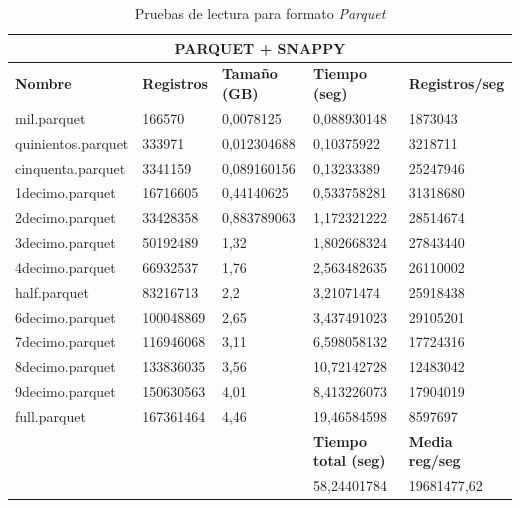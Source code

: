 \begin{table}[htp!]
	\centering
	\caption{Pruebas de lectura para formato \textit{Parquet}}
	\label{velocidadParquet}
	\begin{tabular}{|l|l|l|l|l|}
		\hline
		\multicolumn{5}{|c|}{\textbf{PARQUET + SNAPPY}}                                                                          \\ \hline
		\textbf{Nombre}    & \textbf{Registros} & \textbf{Tamaño (GB)} & \textbf{Tiempo (seg)} & \textbf{Registros/seg} \\ \hline
		mil.parquet        & 166570             & 0,0078125            & 0,088930148                 & 1873043                    \\ \hline
		quinientos.parquet & 333971             & 0,012304688          & 0,10375922                  & 3218711                    \\ \hline
		cinquenta.parquet  & 3341159            & 0,089160156          & 0,13233389                  & 25247946                   \\ \hline
		1decimo.parquet    & 16716605           & 0,44140625           & 0,533758281                 & 31318680                   \\ \hline
		2decimo.parquet    & 33428358           & 0,883789063          & 1,172321222                 & 28514674                   \\ \hline
		3decimo.parquet    & 50192489           & 1,32                 & 1,802668324                 & 27843440                   \\ \hline
		4decimo.parquet    & 66932537           & 1,76                 & 2,563482635                 & 26110002                   \\ \hline
		half.parquet       & 83216713           & 2,2                  & 3,21071474                  & 25918438                   \\ \hline
		6decimo.parquet    & 100048869          & 2,65                 & 3,437491023                 & 29105201                   \\ \hline
		7decimo.parquet    & 116946068          & 3,11                 & 6,598058132                 & 17724316                   \\ \hline
		8decimo.parquet    & 133836035          & 3,56                 & 10,72142728                 & 12483042                   \\ \hline
		9decimo.parquet    & 150630563          & 4,01                 & 8,413226073                 & 17904019                   \\ \hline
		full.parquet       & 167361464          & 4,46                 & 19,46584598                 & 8597697                    \\ \hline
		                   &                    &                      & \textbf{Tiempo total (seg)} & \textbf{Media reg/seg}     \\ \hline
						   &                    &                      & 58,24401784                 & 19681477,62                \\ \hline
	\end{tabular}
\end{table}


